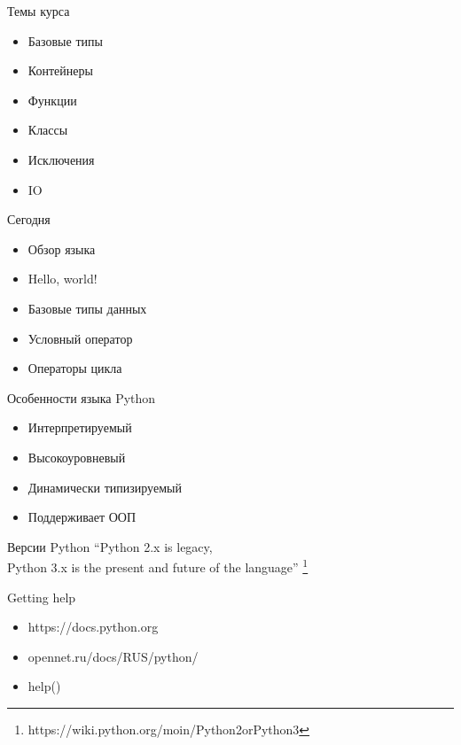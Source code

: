 \documentclass[hyperref={pdftex,unicode}]{beamer}
\begin{document}
\begin{frame}
  \maketitle
\end{frame}

\begin{frame}{Темы курса}
  \begin{itemize}
    \item Базовые типы
    \item Контейнеры
    \item Функции
    \item Классы
    \item Исключения
    \item IO
  \end{itemize}
\end{frame}

\begin{frame}{Сегодня}
  \begin{itemize}
  \item Обзор языка
  \item Hello, world!
  \item Базовые типы данных
  \item Условный оператор
  \item Операторы цикла
  \end{itemize}
\end{frame}

\begin{frame}{Особенности языка Python}
  \begin{itemize}
    \item Интерпретируемый
    \item Высокоуровневый
    \item Динамически типизируемый
    \item Поддерживает ООП
  \end{itemize}
\end{frame}

\begin{frame}{Версии Python}
  \centering
  ``Python 2.x is legacy, \\
  Python 3.x is the present
  and future of the language'' \footnote[frame]{
    https://wiki.python.org/moin/Python2orPython3}
\end{frame}

\begin{frame}{Getting help}
  \begin{itemize}
    \item https://docs.python.org
    \item opennet.ru/docs/RUS/python/
    \item help()
  \end{itemize}
\end{frame}
\end{document}

